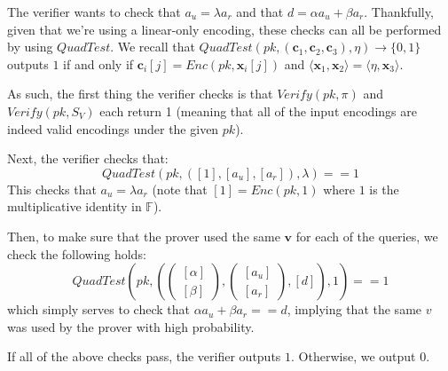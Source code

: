 \documentclass[12pt]{exam}
\begin{document}
\begin{questions}
\begin{solution}
\begin{enumerate}[label=\textbf{\alph*.}]
\begin{itemize}
      The verifier wants to check that $a_u = \lambda a_r$ and that $d = \alpha a_u + \beta a_r$. Thankfully, given that we're using a linear-only encoding, these checks can all be performed by using $\textit{QuadTest}$. We recall that $\textit{QuadTest}(pk, (\textbf{c}_1, \textbf{c}_2, \textbf{c}_3), \eta) \rightarrow \{0,1 \}$ outputs $1$ if and only if $\textbf{c}_i[j] = \textit{Enc}(pk, \textbf{x}_i[j])$ and $\langle \textbf{x}_1, \textbf{x}_2 \rangle = \langle \eta,\textbf{x}_3 \rangle$.

      As such, the first thing the verifier checks is that $\textit{Verify}(pk, \pi)$ and $\textit{Verify}(pk, S_V)$ each return 1 (meaning that all of the input encodings are indeed valid encodings under the given $pk$).

      Next, the verifier checks that:
      \[
        \textit{QuadTest}(pk, ([1], [a_u], [a_r]), \lambda) == 1
      \]
      This checks that $a_u = \lambda a_r$ (note that $[1] = \textit{Enc}(pk, 1)$ where $1$ is the multiplicative identity in $\mathbb{F}$).

      Then, to make sure that the prover used the same $\textbf{v}$ for each of the queries, we check the following holds:
      \[
        \textit{QuadTest}\left(pk, \left( \begin{pmatrix} [\alpha] \\ [\beta] \end{pmatrix},  \begin{pmatrix} [a_u] \\ [a_r] \end{pmatrix} , [d]\right), 1 \right) == 1
      \]
      which simply serves to check that $\alpha a_u + \beta a_r == d$, implying that the same $v$ was used by the prover with high probability.

      If all of the above checks pass, the verifier outputs $1$. Otherwise, we output $0$.



\end{itemize}
\end{enumerate}
\end{solution}
\end{questions}
\end{document}
